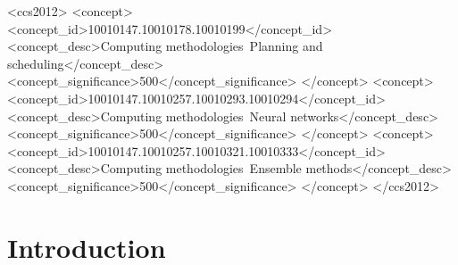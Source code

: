 \documentclass[sigconf]{acmart}
\begin{document}
\begin{CCSXML}
<ccs2012>
   <concept>
       <concept_id>10010147.10010178.10010199</concept_id>
       <concept_desc>Computing methodologies~Planning and scheduling</concept_desc>
       <concept_significance>500</concept_significance>
       </concept>
   <concept>
       <concept_id>10010147.10010257.10010293.10010294</concept_id>
       <concept_desc>Computing methodologies~Neural networks</concept_desc>
       <concept_significance>500</concept_significance>
       </concept>
   <concept>
       <concept_id>10010147.10010257.10010321.10010333</concept_id>
       <concept_desc>Computing methodologies~Ensemble methods</concept_desc>
       <concept_significance>500</concept_significance>
       </concept>
 </ccs2012>
\end{CCSXML}




\maketitle

\section{Introduction}
\end{document}
